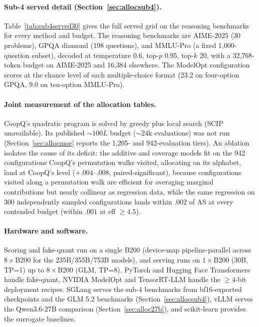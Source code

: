\paragraph{Sub-4 served detail (Section~\ref{sec:allocsub4}).} Table~\ref{tab:sub4served30} gives the
full served grid on the reasoning benchmarks for every method and budget. The reasoning benchmarks
are AIME-2025 (30 problems), GPQA diamond (198 questions), and MMLU-Pro (a fixed
1{,}000-question subset), decoded at temperature 0.6, top-$p$ 0.95, top-$k$ 20, with a 32{,}768-token
budget on AIME-2025 and 16{,}384 elsewhere. The ModelOpt configuration scores at the chance level of
each multiple-choice format (23.2 on four-option GPQA, 9.0 on ten-option MMLU-Pro).





\paragraph{Joint measurement of the allocation tables.} 
CoopQ's quadratic program is solved by
greedy plus local search (SCIP unavailable). Its published ${\sim}100L$ budget (${\sim}24$k evaluations)
was not run (Section~\ref{sec:allocmoe} reports the 1{,}205- and 942-evaluation tiers). An ablation
isolates the cause of its deficit: the additive and coverage models fit on the
942 configurations CoopQ's permutation walks visited, allocating on its alphabet, land at
CoopQ's
level ($+.004$--$.008$, paired-significant), because configurations visited along a permutation walk are
efficient
for averaging marginal contributions but nearly collinear as regression data, while the same regression
on 300 independently sampled configurations lands within $.002$ of AS at every contended budget (within
$.001$ at eff $\ge 4.5$).

\paragraph{Hardware and software.} Scoring and fake-quant run on a single B200 (device-map
pipeline-parallel across $8\times$B200 for the 235B/355B/753B models), and serving runs on $1\times$B200
(30B, TP=1) up to $8\times$B200 (GLM, TP=8). PyTorch and Hugging Face Transformers handle fake-quant,
NVIDIA ModelOpt and TensorRT-LLM handle the $\ge 4$-bit
deployment recipes.
SGLang serves the sub-4 benchmarks from bf16-exported checkpoints and the GLM 5.2 benchmarks
(Section~\ref{sec:allocsub4}),
vLLM serves the Qwen3.6-27B comparison (Section~\ref{sec:alloc27b}), and
scikit-learn
provides the surrogate baselines.

